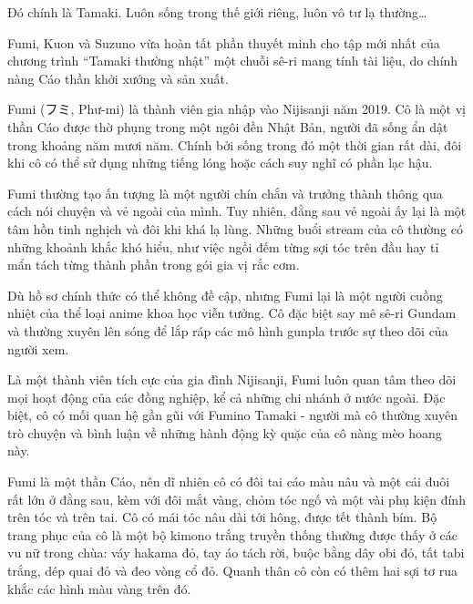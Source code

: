 \documentclass[../main.tex]{subfiles}
\begin{document}

Đó chính là Tamaki. Luôn sống trong thế giới riêng, luôn vô tư lạ thường\dots

\omk


\pov{-}


Fumi, Kuon và Suzuno vừa hoàn tất phần thuyết minh cho tập mới nhất của chương trình ``Tamaki thường nhật'' một chuỗi sê-ri mang tính tài liệu, do chính nàng Cáo thần khởi xướng và sản xuất.

\chrint

Fumi (フミ, Phư-mi) là thành viên gia nhập vào Nijisanji năm 2019. Cô là một vị thần Cáo được thờ phụng trong một ngôi đền Nhật Bản, người đã sống ẩn dật trong khoảng năm mươi năm. Chính bởi sống trong đó một thời gian rất dài, đôi khi cô có thể sử dụng những tiếng lóng hoặc cách suy nghĩ có phần lạc hậu.

Fumi thường tạo ấn tượng là một người chín chắn và trưởng thành thông qua cách nói chuyện và vẻ ngoài của mình. Tuy nhiên, đằng sau vẻ ngoài ấy lại là một tâm hồn tinh nghịch và đôi khi khá lạ lùng. Những buổi stream của cô thường có những khoảnh khắc khó hiểu, như việc ngồi đếm từng sợi tóc trên đầu hay tỉ mẩn tách từng thành phần trong gói gia vị rắc cơm.

Dù hồ sơ chính thức có thể không đề cập, nhưng Fumi lại là một người cuồng nhiệt của thể loại anime khoa học viễn tưởng. Cô đặc biệt say mê sê-ri Gundam và thường xuyên lên sóng để lắp ráp các mô hình gunpla trước sự theo dõi của người xem.

Là một thành viên tích cực của gia đình Nijisanji, Fumi luôn quan tâm theo dõi mọi hoạt động của các đồng nghiệp, kể cả những chi nhánh ở nước ngoài. Đặc biệt, cô có mối quan hệ gần gũi với Fumino Tamaki - người mà cô thường xuyên trò chuyện và bình luận về những hành động kỳ quặc của cô nàng mèo hoang này.

Fumi là một thần Cáo, nên dĩ nhiên cô có đôi tai cáo màu nâu và một cái đuôi rất lớn ở đằng sau, kèm với đôi mắt vàng, chỏm tóc ngố và một vài phụ kiện đính trên tóc và trên tai. Cô có mái tóc nâu dài tới hông, được tết thành bím. Bộ trang phục của cô là một bộ kimono trắng truyền thống thường được thấy ở các vu nữ trong chùa: váy hakama đỏ, tay áo tách rời, buộc bằng dây obi đỏ, tất tabi trắng, dép quai đỏ và đeo vòng cổ đỏ. Quanh thân cô còn có thêm hai sợi tơ rua khắc các hình màu vàng trên đó.
\end{document}
